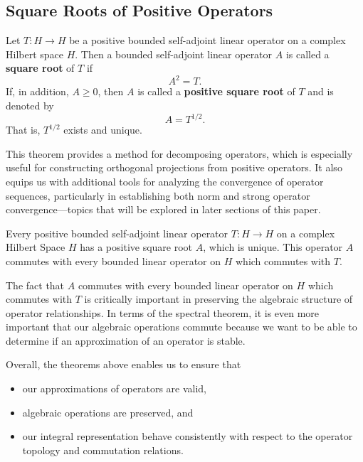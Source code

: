 \subsection{Square Roots of Positive Operators}

\begin{definition}
    Let \( T: H \to H  \) be a positive bounded self-adjoint linear operator on a complex Hilbert space \( H  \). Then a bounded self-adjoint linear operator \( A  \) is called a \textbf{square root} of \( T  \) if  
    \[  A^{2} = T.  \]
    If, in addition, \( A \geq 0  \), then \( A  \) is called a \textbf{positive square root} of \( T  \) and is denoted by
    \[  A = T^{1/2}. \]
    That is, \( T^{1/2}  \) exists and unique.
\end{definition}

This theorem provides a method for decomposing operators, which is especially useful for constructing orthogonal projections from positive operators. It also equips us with additional tools for analyzing the convergence of operator sequences, particularly in establishing both norm and strong operator convergence—topics that will be explored in later sections of this paper.

\begin{theorem}\label{9.4-2}
Every positive bounded self-adjoint linear operator \( T: H \to H  \) on a complex Hilbert Space \( H  \) has a positive square root \( A  \), which is unique. This operator \( A  \) commutes with every bounded linear operator on \( H  \) which commutes with \( T  \).    
\end{theorem}

The fact that \( A  \) commutes with every bounded linear operator on \( H  \) which commutes with \( T  \) is critically important in preserving the algebraic structure of operator relationships. In terms of the spectral theorem, it is even more important that our algebraic operations commute because we want to be able to determine if an approximation of an operator is stable.  

Overall, the theorems above enables us to ensure that
\begin{itemize}
    \item our approximations of operators are valid,
    \item algebraic operations are preserved, and
    \item our integral representation behave consistently with respect to the operator topology and commutation relations.
\end{itemize}



